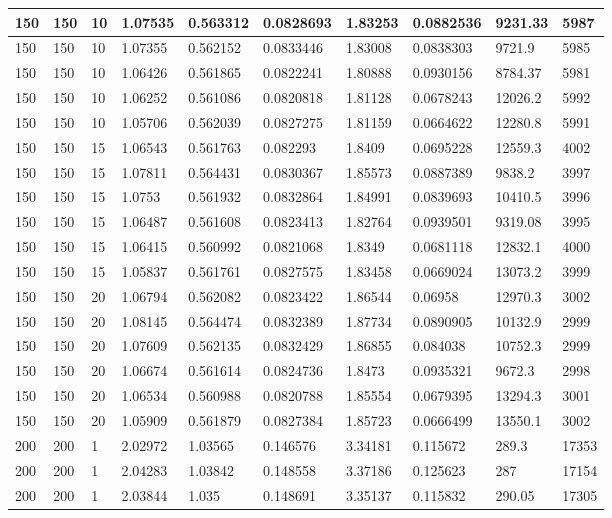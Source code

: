 \begin{landscape}
\begin{longtable}{ | l | l | l | l | l | l | l | l | l | l | }
150 & 150 & 10 & 1.07535 & 0.563312 & 0.0828693 & 1.83253 & 0.0882536 & 9231.33 & 5987\\ \hline
150 & 150 & 10 & 1.07355 & 0.562152 & 0.0833446 & 1.83008 & 0.0838303 & 9721.9 & 5985\\ \hline
150 & 150 & 10 & 1.06426 & 0.561865 & 0.0822241 & 1.80888 & 0.0930156 & 8784.37 & 5981\\ \hline
150 & 150 & 10 & 1.06252 & 0.561086 & 0.0820818 & 1.81128 & 0.0678243 & 12026.2 & 5992\\ \hline
150 & 150 & 10 & 1.05706 & 0.562039 & 0.0827275 & 1.81159 & 0.0664622 & 12280.8 & 5991\\ \hline
150 & 150 & 15 & 1.06543 & 0.561763 & 0.082293 & 1.8409 & 0.0695228 & 12559.3 & 4002\\ \hline
150 & 150 & 15 & 1.07811 & 0.564431 & 0.0830367 & 1.85573 & 0.0887389 & 9838.2 & 3997\\ \hline
150 & 150 & 15 & 1.0753 & 0.561932 & 0.0832864 & 1.84991 & 0.0839693 & 10410.5 & 3996\\ \hline
150 & 150 & 15 & 1.06487 & 0.561608 & 0.0823413 & 1.82764 & 0.0939501 & 9319.08 & 3995\\ \hline
150 & 150 & 15 & 1.06415 & 0.560992 & 0.0821068 & 1.8349 & 0.0681118 & 12832.1 & 4000\\ \hline
150 & 150 & 15 & 1.05837 & 0.561761 & 0.0827575 & 1.83458 & 0.0669024 & 13073.2 & 3999\\ \hline
150 & 150 & 20 & 1.06794 & 0.562082 & 0.0823422 & 1.86544 & 0.06958 & 12970.3 & 3002\\ \hline
150 & 150 & 20 & 1.08145 & 0.564474 & 0.0832389 & 1.87734 & 0.0890905 & 10132.9 & 2999\\ \hline
150 & 150 & 20 & 1.07609 & 0.562135 & 0.0832429 & 1.86855 & 0.084038 & 10752.3 & 2999\\ \hline
150 & 150 & 20 & 1.06674 & 0.561614 & 0.0824736 & 1.8473 & 0.0935321 & 9672.3 & 2998\\ \hline
150 & 150 & 20 & 1.06534 & 0.560988 & 0.0820788 & 1.85554 & 0.0679395 & 13294.3 & 3001\\ \hline
150 & 150 & 20 & 1.05909 & 0.561879 & 0.0827384 & 1.85723 & 0.0666499 & 13550.1 & 3002\\ \hline
200 & 200 & 1 & 2.02972 & 1.03565 & 0.146576 & 3.34181 & 0.115672 & 289.3 & 17353\\ \hline
200 & 200 & 1 & 2.04283 & 1.03842 & 0.148558 & 3.37186 & 0.125623 & 287 & 17154\\ \hline
200 & 200 & 1 & 2.03844 & 1.035 & 0.148691 & 3.35137 & 0.115832 & 290.05 & 17305\\ \hline

\end{longtable}
\end{landscape}
